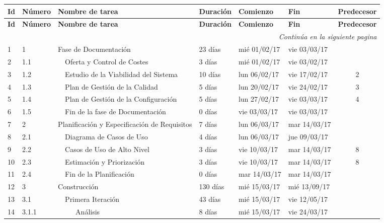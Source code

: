 \begin{center}
\begin{longtable}{  l  l  l  l  l  l  c  }

  \textbf{Id} & \textbf{Número}  & \textbf{Nombre de tarea} & \textbf{Duración} & \textbf{Comienzo} & \textbf{Fin} & \textbf{Predecesor}  \\ \hline \hline
  \endfirsthead
  \textbf{Id} & \textbf{Número}  & \textbf{Nombre de tarea} & \textbf{Duración} & \textbf{Comienzo} & \textbf{Fin} & \textbf{Predecesor}  \\ \hline \hline
  \endhead

  \multicolumn{7}{r}{\textit{Continúa en la siguiente pagina}} \\
  \endfoot
  \endlastfoot

  1 & 1 & Fase de Documentación & 23 días & mié 01/02/17 & vie 03/03/17 &  \\ \hline
	2 & 1.1 &   Oferta y Control de Costes & 3 días & mié 01/02/17 & vie 03/02/17 &  \\ \hline
	3 & 1.2 &   Estudio de la Viabilidad del Sistema & 10 días & lun 06/02/17 & vie 17/02/17 & 2 \\ \hline
	4 & 1.3 &   Plan de Gestión de la Calidad & 5 días & lun 20/02/17 & vie 24/02/17 & 3 \\ \hline
	5 & 1.4 &   Plan de Gestión de la Configuración & 5 días & lun 27/02/17 & vie 03/03/17 & 4 \\ \hline
	6 & 1.5 &   Fin de la fase de Documentación & 0 días & vie 03/03/17 & vie 03/03/17 &  \\ \hline
	7 & 2 & Planificación y Especificación de Requisitos & 7 días & lun 06/03/17 & mar 14/03/17 &  \\ \hline
	8 & 2.1 &   Diagrama de Casos de Uso & 4 días & lun 06/03/17 & jue 09/03/17 &  \\ \hline
	9 & 2.2 &   Casos de Uso de Alto Nivel & 3 días & vie 10/03/17 & mar 14/03/17 & 8 \\ \hline
	10 & 2.3 &   Estimación y Priorización & 3 días & vie 10/03/17 & mar 14/03/17 & 8 \\ \hline
	11 & 2.4 &   Fin de la Planificación & 0 días & mar 14/03/17 & mar 14/03/17 &  \\ \hline
	12 & 3 & Construcción & 130 días & mié 15/03/17 & mié 13/09/17 &  \\ \hline
	13 & 3.1 &   Primera Iteración & 43 días & mié 15/03/17 & vie 12/05/17 &  \\ \hline
	14 & 3.1.1 &      Análisis & 8 días & mié 15/03/17 & vie 24/03/17 &  \\ \hline

\end{longtable}
\end{center}
